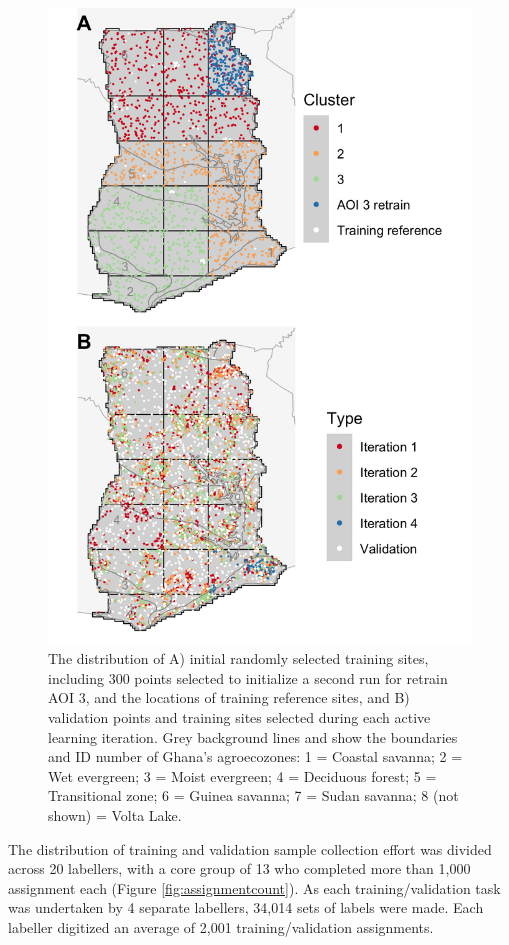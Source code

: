 \documentclass[
  11pt,
  a4paper]{article}
\begin{document}
\begin{figure}[!ht]

{\centering \includegraphics[width=0.7\linewidth,]{figures/si_training_validation_pts} 

}

\caption{The distribution of A) initial randomly selected training sites, including 300 points selected to initialize a second run for retrain AOI 3, and the locations of training reference sites, and B) validation points and training sites selected during each active learning iteration. Grey background lines and show the boundaries and ID number of Ghana's agroecozones: 1 = Coastal savanna; 2 = Wet evergreen; 3 = Moist evergreen; 4 = Deciduous forest; 5 = Transitional zone; 6 = Guinea savanna; 7 = Sudan savanna; 8 (not shown) = Volta Lake.}\label{fig:trainval}
\end{figure}

The distribution of training and validation sample collection effort was
divided across 20 labellers, with a core group of 13 who completed more
than 1,000 assignment each (Figure \ref{fig:assignmentcount}). As each
training/validation task was undertaken by 4 separate labellers, 34,014
sets of labels were made. Each labeller digitized an average of 2,001
training/validation assignments.
\end{document}
